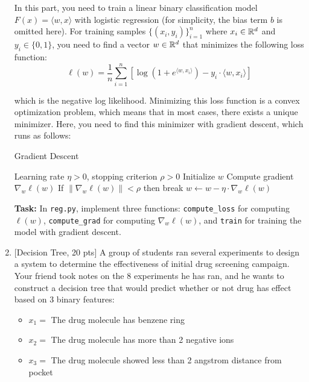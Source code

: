\documentclass[11pt]{article}
\begin{document}
\begin{enumerate}
In this part, you need to train a linear binary classification model $F(x) = \langle w, x \rangle$ with logistic regression (for simplicity, the bias term $b$ is omitted here). For training samples $\{ (x_i, y_i) \}_{i=1}^n$ where $x_i \in \mathbb{R}^d$ and $y_i \in \{ 0,1 \}$, you need to find a vector $w \in \mathbb{R}^d$ that minimizes the following loss function:
\[
    \ell(w) = \frac{1}{n} \sum_{i=1}^n  \left [  \log (1 + e^{\langle w, x_i \rangle}) - y_i \cdot \langle w, x_i \rangle \right ]
\]

which is the negative log likelihood. Minimizing this loss function is a convex optimization problem, which means that in most cases, there exists a unique minimizer. Here, you need to find this minimizer with gradient descent, which runs as follows:
\begin{algorithm}[!htb]
\caption{Gradient Descent}
\begin{algorithmic}
\Require Learning rate $\eta > 0$, stopping criterion $\rho > 0$
\State Initialize $w$
    \State Compute gradient $\nabla_w \ell(w)$
    \State If $\| \nabla_w \ell(w) \| < \rho$ then break
    \State $w \gets w - \eta \cdot \nabla_w \ell(w)$
\EndWhile
\end{algorithmic}
\end{algorithm}

\textbf{Task:} In \texttt{reg.py}, implement three functions: \texttt{compute\_loss} for computing $\ell(w)$, \texttt{compute\_grad} for computing $\nabla_w \ell(w)$, and \texttt{train} for training the model with gradient descent. 



\item {[Decision Tree, 20 pts]} A group of students ran several experiments to design a system to determine the effectiveness of initial drug screening campaign. Your friend took notes on the 8 experiments he has ran, and he wants to construct a decision tree that would predict whether or not drug has effect based on 3 binary features:
\begin{itemize}
    \item $x_1=$ The drug molecule has benzene ring
    \item $x_2=$ The drug molecule has more than 2 negative ions
    \item $x_3=$ The drug molecule showed less than 2 angstrom distance from pocket
\end{itemize}


\end{enumerate}
\end{document}
